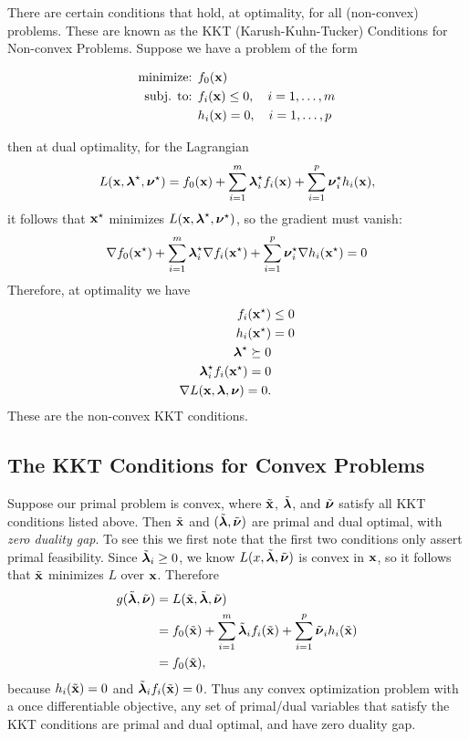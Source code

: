 \documentclass{article}
\begin{document}
There are certain conditions that hold, at optimality, for
all (non-convex) problems. These are known as the KKT (Karush-Kuhn-Tucker)
Conditions for Non-convex Problems. Suppose we have a problem
of the form

\begin{align*}
    \text{minimize: } & f_0({\bf x})\\
    \text{subj. to: } & f_i({\bf x}) \leq 0, \quad i=1,\dots,m\\
                      & h_i({\bf x}) = 0, \quad i=1,\dots,p
\end{align*}

then at dual optimality, for the Lagrangian
\[
    L({\bf x}, \hbox{\boldmath$\lambda$}^\star, \hbox{\boldmath$\nu$}^\star) = f_0({\bf x}) + \sum_{i=1}^m \hbox{\boldmath$\lambda$}_i^\star f_i({\bf x}) + \sum_{i=1}^p \hbox{\boldmath$\nu$}_i^\star h_i({\bf x}),
\]
it follows that ${\bf x}^\star$ minimizes $L({\bf x},\hbox{\boldmath$\lambda$}^\star,\hbox{\boldmath$\nu$}^\star)$, so
the gradient must vanish:
\[
    \nabla f_0({\bf x}^\star) + \sum_{i=1}^m \hbox{\boldmath$\lambda$}_i^\star \nabla f_i({\bf x}^\star) + \sum_{i=1}^p \hbox{\boldmath$\nu$}_i^\star \nabla h_i({\bf x}^\star) = 0
\]
Therefore, at optimality we have
\begin{align*}
    f_i({\bf x}^\star) &\leq 0\\
    h_i({\bf x}^\star) & = 0\\
    \hbox{\boldmath$\lambda$}^\star \succeq 0\\
    \hbox{\boldmath$\lambda$}_i^\star f_i({\bf x}^\star) = 0\\
    \nabla L({\bf x}, \hbox{\boldmath$\lambda$}, \hbox{\boldmath$\nu$}) = 0.
\end{align*}
These are the non-convex KKT conditions.

\subsection{The KKT Conditions for Convex Problems}

Suppose our primal problem is convex, where $\tilde {{\bf x}}$, $\tilde{\hbox{\boldmath$\lambda$}}$,
and $\tilde{\hbox{\boldmath$\nu$}}$ satisfy all KKT conditions listed above. Then $\tilde{{\bf x}}$
and $(\tilde{\hbox{\boldmath$\lambda$}}, \tilde{\hbox{\boldmath$\nu$}})$ are primal and dual optimal, with \textit{zero duality gap}.
To see this we first note that the first two conditions only
assert primal feasibility. Since $\tilde{\hbox{\boldmath$\lambda$}}_i \geq 0$, we know $L(x,\tilde{\hbox{\boldmath$\lambda$}},
\tilde{\hbox{\boldmath$\nu$}})$ is convex in ${\bf x}$, so it follows that $\tilde{{\bf x}}$ minimizes $L$
over ${\bf x}$. Therefore
\begin{align*}
    g(\tilde{\hbox{\boldmath$\lambda$}}, \tilde{\hbox{\boldmath$\nu$}}) &= L(\tilde{{\bf x}}, \tilde{\hbox{\boldmath$\lambda$}}, \tilde{\hbox{\boldmath$\nu$}})\\
    &= f_0(\tilde{{\bf x}}) + \sum_{i=1}^m \tilde{\hbox{\boldmath$\lambda$}}_i f_i(\tilde{{\bf x}}) + \sum_{i=1}^p \tilde{\hbox{\boldmath$\nu$}}_i h_i(\tilde{{\bf x}})\\
    &= f_0(\tilde{{\bf x}}),
\end{align*}
because $h_i(\tilde{{\bf x}}) = 0$ and $\tilde{\hbox{\boldmath$\lambda$}}_i f_i(\tilde{{\bf x}}) = 0$. Thus any convex
optimization problem with a once differentiable objective, any set of primal/dual variables
that satisfy the KKT conditions are primal and dual optimal, and have zero duality gap.\\
\end{document}
